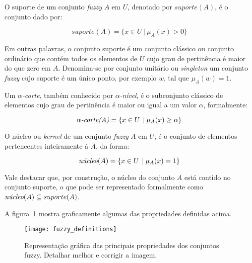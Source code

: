 \begin{defn}
O suporte de um conjunto \emph{fuzzy} $A$ em $U$, denotado por $suporte(A)$, é o conjunto dado por:

\begin{equation}
  suporte(A) = \{x \in U \ |\ \mu_A(x) > 0 \}
\label{equ:conjunto_fuzzy_suporte}
\end{equation}

\end{defn}

Em outras palavras, o conjunto suporte é um conjunto clássico ou conjunto ordinário que contém todos os elementos de $U$ cujo grau de pertinência é maior do que zero em $A$. Denomina-se por conjunto unitário ou \emph{singleton} um conjunto \emph{fuzzy} cujo suporte é um único ponto, por exemplo $w$, tal que $\mu_A(w) = 1$.

\begin{defn}
Um $\alpha$\emph{-corte}, também conhecido por $\alpha$\emph{-nível}, é o subconjunto clássico de elementos cujo grau de pertinência é maior ou igual a um valor $\alpha$, formalmente:

\begin{equation}
  \alpha\emph{-corte(A)} = \{x \in U \ |\ \mu_A(x) \geq \alpha \}
\label{equ:conjunto_fuzzy_alpha_corte}
\end{equation}
\end{defn}

\begin{defn}
O núcleo ou \emph{kernel} de um conjunto \emph{fuzzy} $A$ em $U$, é o conjunto de elementos pertencentes inteiramente à $A$, da forma:

\begin{equation}
  \emph{núcleo}(A) = \{x \in U \ |\ \mu_A(x) = 1 \}
\label{equ:conjunto_fuzzy_kernel}
\end{equation}
\end{defn}

Vale destacar que, por construção, o núcleo do conjunto $A$ está contido no conjunto suporte, o que pode ser representado formalmente como $\emph{núcleo}(A) \subseteq suporte(A)$.

A figura~\ref{fig:fuzzy_definitions} mostra graficamente algumas das propriedades definidas acima.

\begin{figure}[!h]
  \centering
  \texttt{[image: fuzzy\_definitions]}
  \caption{Representação gráfica das principais propriedades dos conjuntos fuzzy. Detalhar melhor e corrigir a imagem.}
  \label{fig:fuzzy_definitions} 
\end{figure}

